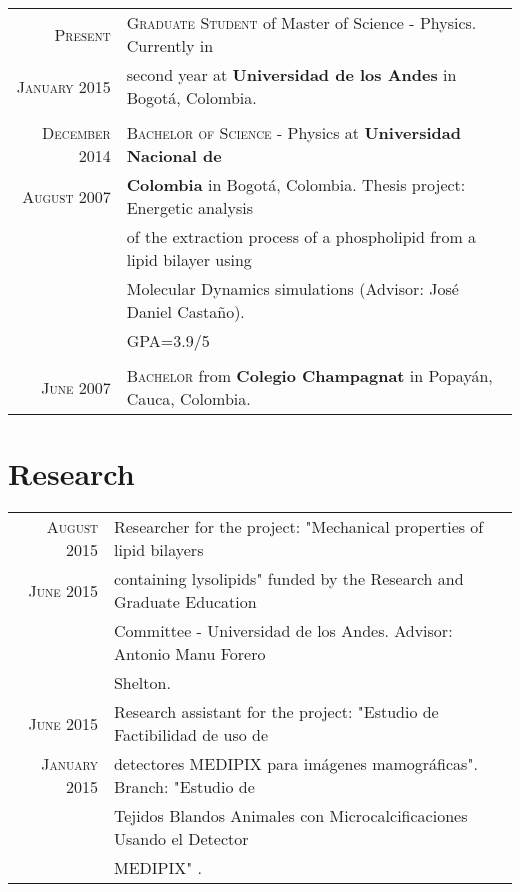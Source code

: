 \documentclass[a4paper,10pt]{article} %
\begin{document}
\begin{tabular}{rl}	

\textsc{Present} & \textsc{Graduate Student} of Master of Science - Physics. Currently in \\ \textsc{January 2015} & second year at \textbf{Universidad de los Andes} in Bogot\'a, Colombia. \\
&\\

\textsc{December 2014} & \textsc{Bachelor of Science} - Physics at \textbf{Universidad Nacional de}  \\ \textsc{August 2007} & \textbf{Colombia} in Bogot\'a, Colombia. Thesis project: Energetic analysis \\ & of the  extraction process of a phospholipid from a lipid bilayer using  \\ & Molecular Dynamics simulations (Advisor: Jos\'e Daniel Casta\~no). \\ & GPA=3.9/5 \\
&\\

\textsc{June 2007}& \textsc{}\textsc{Bachelor} from \normalsize\textbf{Colegio Champagnat} in Popay\'an, Cauca, Colombia.\\

\end{tabular}


\color{OrangeRed}
\section{Research}
\color{black}

\begin{tabular}{rl}

\textsc{August 2015} & Researcher for the project: "Mechanical properties of lipid bilayers \\ 
\textsc{June 2015}   & containing lysolipids" funded by the Research and Graduate Education  \\ 
& Committee - Universidad de los Andes. Advisor: Antonio Manu Forero \\
& Shelton.  \\
\textsc{June 2015} & Research assistant for the project: "Estudio de Factibilidad de uso de \\ 
\textsc{January 2015} & detectores MEDIPIX para imágenes mamográficas". Branch: "Estudio de \\ 
& Tejidos Blandos Animales con Microcalciﬁcaciones Usando el Detector \\
& MEDIPIX" . \\

\end{tabular}
\end{document}
